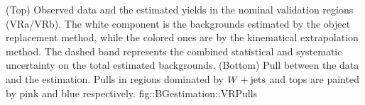 \clearpage


{(Top) Observed data and the estimated yields in the nominal validation regions (VRa/VRb). 
The white component is the backgrounds estimated by the object replacement method, while the colored ones are by the kinematical extrapolation method. The dashed band represents the combined statistical and systematic uncertainty on the total estimated backgrounds. (Bottom) Pull between the data and the estimation. Pulls in regions dominated by $W+\mathrm{jets}$ and tops are painted by pink and blue respectively.}
{fig::BGestimation::VRPulls}

\clearpage




